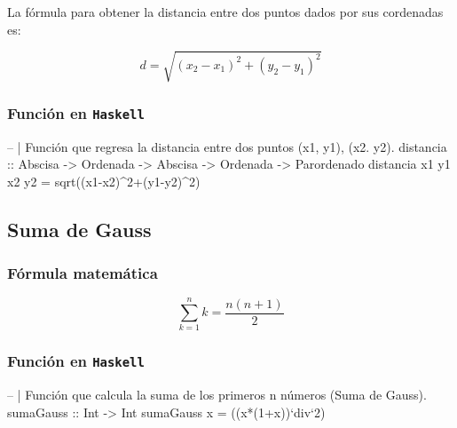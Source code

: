 \documentclass[
]{article}
\newenvironment{Shaded}{\begin{snugshade}}{\end{snugshade}}
\newcommand{\DecValTok}[1]{\textcolor[rgb]{0.00,0.00,0.81}{#1}}
\newcommand{\NormalTok}[1]{#1}
\begin{document}
La fórmula para obtener la distancia entre dos puntos dados por sus
cordenadas es:

\[
d =\sqrt{(x_2 - x_1)^2 + (y_2 - y_1)^2}
\]

\hypertarget{funciuxf3n-en-haskell-1}{%
\subsubsection{\texorpdfstring{Función en
\texttt{Haskell}}{Función en Haskell}}\label{funciuxf3n-en-haskell-1}}

\begin{Shaded}
\begin{Highlighting}[]
\NormalTok{-- | Función que regresa la distancia entre dos puntos (x1, y1), (x2. y2).}
\NormalTok{distancia :: Abscisa -> Ordenada -> Abscisa -> Ordenada -> Parordenado}
\NormalTok{distancia x1 y1 x2 y2 = sqrt((x1-x2)^}\DecValTok{2}\NormalTok{+(y1-y2)^}\DecValTok{2}\NormalTok{)}
\end{Highlighting}
\end{Shaded}

\hypertarget{suma-de-gauss}{%
\subsection{Suma de Gauss}\label{suma-de-gauss}}

\hypertarget{fuxf3rmula-matemuxe1tica-2}{%
\subsubsection{Fórmula matemática}\label{fuxf3rmula-matemuxe1tica-2}}

\[
\sum_{k=1}^{n}k=\frac{n(n+1)}{2} 
\]

\hypertarget{funciuxf3n-en-haskell-2}{%
\subsubsection{\texorpdfstring{Función en
\texttt{Haskell}}{Función en Haskell}}\label{funciuxf3n-en-haskell-2}}

\begin{Shaded}
\begin{Highlighting}[]
\NormalTok{-- | Función que calcula la suma de los primeros n números (Suma de Gauss).}
\NormalTok{sumaGauss :: Int -> Int}
\NormalTok{sumaGauss x  = ((x*(}\DecValTok{1}\NormalTok{+x))`div`}\DecValTok{2}\NormalTok{)}
\end{Highlighting}
\end{Shaded}
\end{document}
